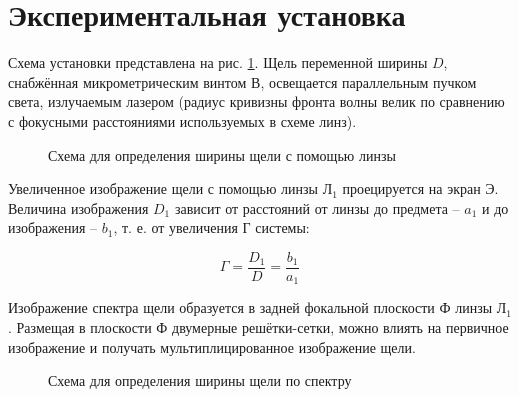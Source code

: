 \documentclass[a5paper,10pt, twoside]{article} %
\begin{document}
\section{Экспериментальная установка}

Схема установки представлена на рис. \ref{ris:ust}. Щель переменной ширины $D$, снабжённая 
микрометрическим винтом В, освещается параллельным пучком света, излучаемым
лазером (радиус кривизны фронта волны велик по сравнению с фокусными расстояниями используемых 
в схеме линз).

\begin{figure}[h]\label{ris:ust}
	\caption{Схема для определения ширины щели с помощью линзы}
\end{figure}

Увеличенное изображение щели с помощью линзы $\text{Л}_1$ проецируется на экран Э. Величина
изображения $D_1$ зависит от расстояний от линзы до предмета -- $a_1$ и до изображения -- $b_1$, 
т. е. от увеличения Г системы:

\begin{equation}\label{eq:zoom}
	\Gamma = \frac{D_1}{D} = \frac{b_1}{a_1}
\end{equation}

Изображение спектра щели образуется в задней фокальной плоскости Ф линзы $\text{Л}_1$. Размещая в 
плоскости Ф двумерные решётки-сетки, можно влиять на первичное изображение и получать 
мультиплицированное изображение щели.

\begin{figure}[h]\label{ris:spectrum}
	\caption{Схема для определения ширины щели по спектру}
\end{figure}
\end{document}
